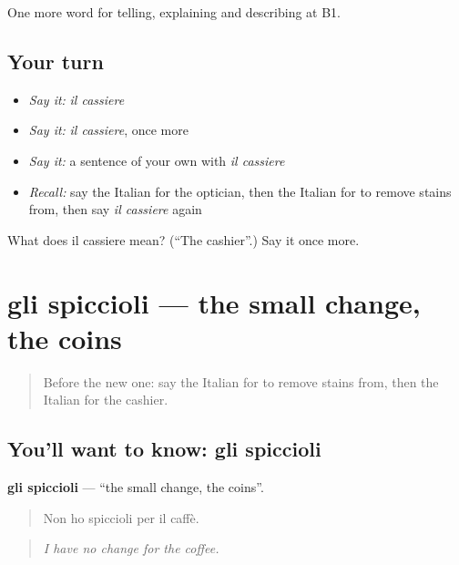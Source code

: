 \begin{grammarlens}[title={What you've built}]
One more word for telling, explaining and describing at B1.
\end{grammarlens}

\subsection*{Your turn}
\begin{itemize}
\raggedright
  \item \emph{Say it:} \emph{il cassiere}
  \item \emph{Say it:} \emph{il cassiere}, once more
  \item \emph{Say it:} a sentence of your own with \emph{il cassiere}
  \item \emph{Recall:} say the Italian for the optician, then the Italian for to remove stains from, then say \emph{il cassiere} again
\end{itemize}

\begin{tcolorbox}[breakable,colback=teal!4,colframe=teal!35!black,title={Before you move on}]
What does il cassiere mean? (\textquotedblleft{}The cashier\textquotedblright{}.) Say it once more.
\end{tcolorbox}
\section[gli spiccioli]{gli spiccioli — the small change, the coins}

\label{lesson:IT-C457-spiccioli}



\begin{quote}
Before the new one: say the Italian for to remove stains from, then the Italian for the cashier.
\end{quote}

\subsection*{You'll want to know: gli spiccioli}
\textbf{gli spiccioli} — \textquotedblleft{}the small change, the coins\textquotedblright{}.

\begin{quote}
Non ho spiccioli per il caffè.
\end{quote}

\begin{quote}
\emph{I have no change for the coffee.}
\end{quote}

